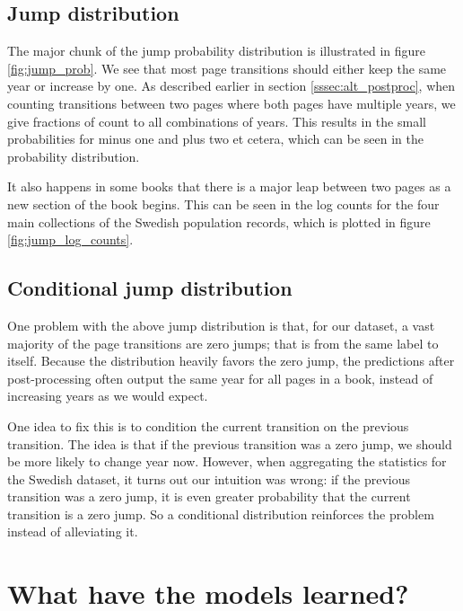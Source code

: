 \subsection{Jump distribution}



The major chunk of the jump probability distribution is illustrated in figure \ref{fig:jump_prob}. We see that most page transitions should either keep the same year or increase by one.
As described earlier in section \ref{sssec:alt_postproc}, when counting transitions between two pages where both pages have multiple years, we give fractions of count to all combinations of years. This results in the small probabilities for minus one and plus two et cetera, which can be seen in the probability distribution.

It also happens in some books that there is a major leap between two pages as a new section of the book begins. This can be seen in the log counts for the four main collections of the Swedish population records, which is plotted in figure \ref{fig:jump_log_counts}.

\subsection{Conditional jump distribution}
One problem with the above jump distribution is that, for our dataset, a vast majority of the page transitions are zero jumps; that is from the same label to itself.
Because the distribution heavily favors the zero jump, the predictions after post-processing often output the same year for all pages in a book, instead of increasing years as we would expect.

One idea to fix this is to condition the current transition on the previous transition. The idea is that if the previous transition was a zero jump, we should be more likely to change year now. However, when aggregating the statistics for the Swedish dataset, it turns out our intuition was wrong: if the previous transition was a zero jump, it is even greater probability that the current transition is a zero jump. So a conditional distribution reinforces the problem instead of alleviating it.

\section{What have the models learned?}

